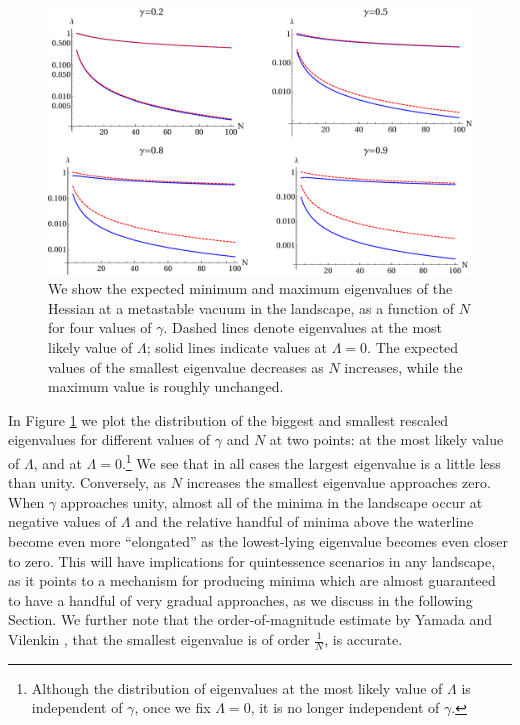 \documentclass[12pt]{article}
\begin{document}
\begin{figure} 
  \centering
  \includegraphics[width=.9\linewidth]{eign.eps}
  \caption{We show the expected minimum and maximum eigenvalues of the Hessian at a metastable vacuum in the landscape, as a function of $N$ for four values of $\gamma$.  Dashed lines denote eigenvalues at the most likely value of $\Lambda$; solid lines indicate values at $\Lambda=0$. The expected values of the smallest eigenvalue decreases as $N$ increases, while the maximum value is roughly unchanged. }
  \label{eigen}
\end{figure}

In Figure \ref{eigen} we plot the distribution of the biggest and smallest rescaled eigenvalues for different values of $\gamma$ and $N$ at two points: at the most likely value of $\Lambda$, and at $\Lambda=0$.\footnote{Although the distribution of eigenvalues at the most likely value of $\Lambda$ is independent of $\gamma$, once we fix $\Lambda=0$, it is no longer independent of $\gamma$.} We see that in all cases the largest eigenvalue is a little less than unity. Conversely, as $N$ increases the smallest eigenvalue approaches zero. When $\gamma$ approaches unity, almost all of the minima in the landscape  occur at negative values of $\Lambda$ and the relative handful of minima above the waterline become even more ``elongated'' as the lowest-lying eigenvalue becomes even closer to zero. This will have implications for quintessence scenarios in any landscape, as it points to a mechanism for producing minima which are almost guaranteed to have a handful of very gradual approaches, as we discuss in the following Section. We further note that the order-of-magnitude estimate by Yamada and Vilenkin \cite{Yamada2018}, that the smallest eigenvalue is of order $\frac{1}{N}$, is accurate.
 
\end{document}

